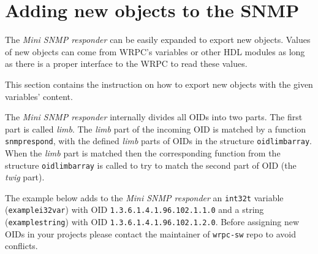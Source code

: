 \documentclass[a4paper, 12pt]{article}
\renewcommand{\_}{\underscore\allowbreak}
\begin{document}
\newpage
\section{Adding new objects to the SNMP}
\label{appendix:adding_new_objects_to_the_SNMP}

The \textit{Mini SNMP responder} can be easily expanded to export new objects.
Values of new objects can come from WRPC's variables or other HDL modules
as long as there is a proper interface to the WRPC to read these values.

This section contains the instruction on how to export new objects with
the given variables' content.

The \textit{Mini SNMP responder} internally divides all OIDs into two parts.
The first part is called \textit{limb}. The \textit{limb} part of the incoming OID is
matched by a function \texttt{snmp\_respond}, with the defined \textit{limb} parts of OIDs
in the structure \texttt{oid\_limb\_array}.
When the \textit{limb} part is matched then the corresponding function from
the structure \texttt{oid\_limb\_array} is called to try to match the second part of
OID (the \textit{twig} part).

\begin{sloppypar} %
The example below adds to the \textit{Mini SNMP responder} an \texttt{int32\_t} variable
(\texttt{example\_i32var}) with OID \texttt{1.3.6.1.4.1.96.102.1.1.0} and a string
(\texttt{example\_string}) with OID \texttt{1.3.6.1.4.1.96.102.1.2.0}.
Before assigning new OIDs in your projects please contact the maintainer of
\texttt{wrpc-sw} repo to avoid conflicts.
\end{sloppypar}
\end{document}
